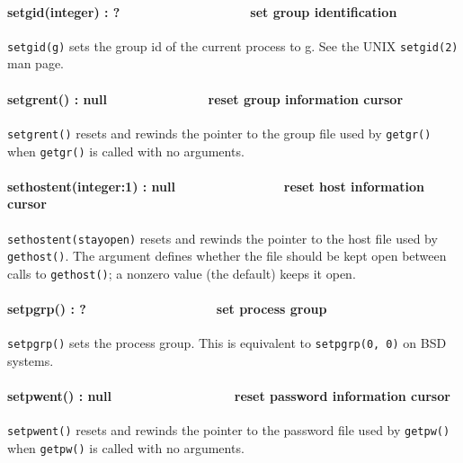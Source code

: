 \paragraph[setgid(integer) : ?\ \ \ \ \ \ \ \ \ \ \ \  \ \ \ \ \ \ set
group identification]{setgid(integer) : ?\ \ \ \ \ \ \ \ \ \ \ \ 
\ \ \ \ \ \ set group identification}
\texttt{setgid(g)} sets the group id of the current process to g. See the UNIX
\texttt{setgid(2)} man page. 

\paragraph[setgrent() : null\ \ \ \ \ \ \ \ \ \  \ \ \ \ reset group
information cursor]{setgrent() : null\ \ \ \ \ \ \ \ \ \  \ \ \ \ reset
group information cursor}
\texttt{setgrent()} resets and rewinds the pointer to the group file used by
\texttt{getgr()} when \texttt{getgr()} is called with no arguments. 

\paragraph[sethostent(integer:1) : null\ \ \ \ \ \ \ \ 
\ \ \ \ \ \ \ reset host information cursor]{sethostent(integer:1) :
null\ \ \ \ \ \ \ \  \ \ \ \ \ \ \ reset host information cursor}
\texttt{sethostent(stayopen)} resets and rewinds the pointer to the host file
used by \texttt{gethost()}. The argument defines whether the file should be kept
open between calls to \texttt{gethost()}; a nonzero value (the default) keeps it
open. 

\paragraph[setpgrp() : ?\ \ \ \ \ \ \ \ \ \ \ \ \ \ \ \  \ \ set process
group]{setpgrp() : ?\ \ \ \ \ \ \ \ \ \ \ \ \ \ \ \  \ \ set process
group}
\texttt{setpgrp()} sets the process group. This is equivalent to
\texttt{setpgrp(0, 0)} on BSD systems. 

\paragraph[setpwent() : null\ \ \ \ \ \ \ \  \ \ \ \ \ \ \ \ \ reset
password information cursor]{setpwent() : null\ \ \ \ \ \ \ \ 
\ \ \ \ \ \ \ \ \ reset password information cursor}
\texttt{setpwent()} resets and rewinds the pointer to the password file used by
\texttt{getpw()} when \texttt{getpw()} is called with no arguments.

